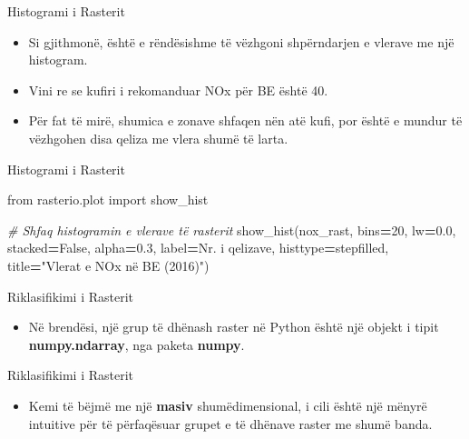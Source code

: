 \documentclass[
  ignorenonframetext,
]{beamer}
\newenvironment{Shaded}{\begin{snugshade}}{\end{snugshade}}
\newcommand{\CommentTok}[1]{\textcolor[rgb]{0.56,0.35,0.01}{\textit{#1}}}
\newcommand{\DecValTok}[1]{\textcolor[rgb]{0.00,0.00,0.81}{#1}}
\newcommand{\FloatTok}[1]{\textcolor[rgb]{0.00,0.00,0.81}{#1}}
\newcommand{\ImportTok}[1]{#1}
\newcommand{\NormalTok}[1]{#1}
\newcommand{\OperatorTok}[1]{\textcolor[rgb]{0.81,0.36,0.00}{\textbf{#1}}}
\newcommand{\StringTok}[1]{\textcolor[rgb]{0.31,0.60,0.02}{#1}}
\newcommand{\VariableTok}[1]{\textcolor[rgb]{0.00,0.00,0.00}{#1}}
\providecommand{\tightlist}{%
  \setlength{\itemsep}{0pt}\setlength{\parskip}{0pt}}
\begin{document}
\begin{frame}{Histogrami i Rasterit}
\protect\hypertarget{histogrami-i-rasterit}{}
\begin{itemize}
\item
  Si gjithmonë, është e rëndësishme të vëzhgoni shpërndarjen e vlerave
  me një histogram.
\item
  Vini re se kufiri i rekomanduar NOx për BE është 40.
\item
  Për fat të mirë, shumica e zonave shfaqen nën atë kufi, por është e
  mundur të vëzhgohen disa qeliza me vlera shumë të larta.
\end{itemize}
\end{frame}

\begin{frame}[fragile]{Histogrami i Rasterit}
\protect\hypertarget{histogrami-i-rasterit-1}{}

\begin{Shaded}
\begin{Highlighting}[]
\ImportTok{from}\NormalTok{ rasterio.plot }\ImportTok{import}\NormalTok{ show\_hist}

\CommentTok{\# Shfaq histogramin e vlerave të rasterit}
\NormalTok{show\_hist(nox\_rast, bins}\OperatorTok{=}\DecValTok{20}\NormalTok{, lw}\OperatorTok{=}\FloatTok{0.0}\NormalTok{, stacked}\OperatorTok{=}\VariableTok{False}\NormalTok{, alpha}\OperatorTok{=}\FloatTok{0.3}\NormalTok{, label}\OperatorTok{=}\StringTok{\textquotesingle{}Nr. i qelizave\textquotesingle{}}\NormalTok{,}
\NormalTok{    histtype}\OperatorTok{=}\StringTok{\textquotesingle{}stepfilled\textquotesingle{}}\NormalTok{, title}\OperatorTok{=}\StringTok{"Vlerat e NOx në BE (2016)"}\NormalTok{)}
\end{Highlighting}
\end{Shaded}
\end{frame}

\begin{frame}{Riklasifikimi i Rasterit}
\protect\hypertarget{riklasifikimi-i-rasterit}{}
\begin{itemize}
\tightlist
\item
  Në brendësi, një grup të dhënash raster në Python është një objekt i
  tipit \textbf{numpy.ndarray}, nga paketa \textbf{numpy}.
\end{itemize}
\end{frame}

\begin{frame}{Riklasifikimi i Rasterit}
\protect\hypertarget{riklasifikimi-i-rasterit-1}{}
\begin{itemize}
\tightlist
\item
  Kemi të bëjmë me një \textbf{masiv} shumëdimensional, i cili është një
  mënyrë intuitive për të përfaqësuar grupet e të dhënave raster me
  shumë banda.
\end{itemize}
\end{frame}
\end{document}
